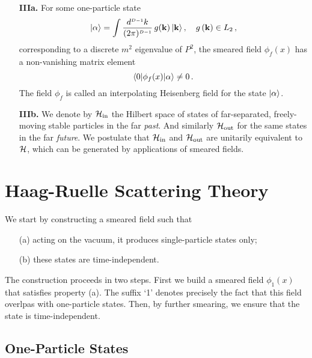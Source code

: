 \begin{enumerate}
    \item [{\bf IIIa.}] For some one-particle state
    \begin{equation}
        \label{eq:OnePartStateEx}
        | \alpha \rangle = \int \frac{d^{\scriptscriptstyle{D-1}}k}{(2\pi)^{\scriptscriptstyle{D-1}}}\, 
        g(\mathbf{k}) \, | \mathbf{k} \rangle\, , \quad g\left(\mathbf{k}\right) \in L_2\, ,
    \end{equation}
    corresponding to a discrete $m^2$ eigenvalue of $P^2$, the smeared field $\phi_f(x)$ has a 
    non-vanishing matrix element
    \begin{equation}
        \label{eq:PhiFME}
        \langle 0 | \phi_f(x) | \alpha \rangle \neq 0\, .
    \end{equation}
    The field $\phi_f$ is called an interpolating Heisenberg field for the 
    state $| \alpha \rangle$.
    \item [{\bf IIIb.}] We denote by $\mathcal{H}_\mathrm{in}$ the Hilbert space of
    states of far-separated, freely-moving stable particles in the far {\em
    past}. And similarly $\mathcal{H}_\mathrm{out}$ for the same states in the far
    {\em future}. We postulate that  $\mathcal{H}_\mathrm{in}$ and
    $\mathcal{H}_\mathrm{out}$ are unitarily equivalent to $\mathcal{H}$, which can be
    generated by applications of smeared fields. 
\end{enumerate}

\section{Haag-Ruelle Scattering Theory}
\label{sec:HaagRuelleScat}

We start by constructing a smeared field such that
\begin{enumerate}
    \item [(a)] acting on the vacuum, it produces single-particle states only; 
    \item [(b)] these states are time-independent.
\end{enumerate}
The construction proceeds in two steps. First we build a smeared field
$\phi_1(x)$ that satisfies property (a). The suffix `1' denotes precisely the
fact that this field overlpas with one-particle states. Then, by further
smearing, we ensure that the state is time-independent. 

\subsection{One-Particle States}
\label{sec:OnePartStat}

